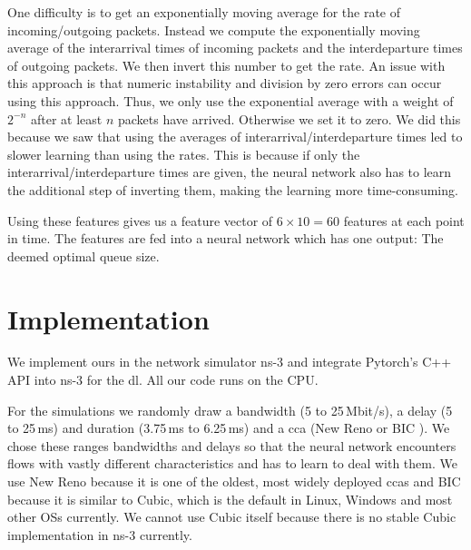 \documentclass[conference]{IEEEtran}
\begin{document}
One difficulty is to get an exponentially moving average for the rate of incoming/outgoing packets. Instead we compute the exponentially moving average of the interarrival times of incoming packets and the interdeparture times of outgoing packets. We then invert this number to get the rate. An issue with this approach is that numeric instability and division by zero errors can occur using this approach. Thus, we only use the exponential average with a weight of $2^{-n}$ after at least $n$ packets have arrived. Otherwise we set it to zero. We did this because we saw that using the averages of interarrival/interdeparture times led to slower learning than using the rates. This is because if only the interarrival/interdeparture times are given, the neural network also has to learn the additional step of inverting them, making the learning more time-consuming. 

Using these features gives us a feature vector of $6\times 10 = 60$ features at each point in time. The features are fed into a neural network which has one output: The deemed optimal queue size.  

\section{Implementation} 

We implement \gls{ours} in the network simulator ns-3 \cite{nsnam_ns-3_nodate} and integrate Pytorch's \cite{paszke_pytorch_2019} C++ API into ns-3 for the \gls{dl}. All our code runs on the CPU. 

For the simulations we randomly draw a bandwidth (5 to 25\,Mbit/s), a delay (5 to 25\,ms) and duration (3.75\,ms to 6.25\,ms) and a \gls{cca} (New Reno or BIC \cite{lisong_xu_binary_2004}). We chose these ranges bandwidths and delays so that the neural network encounters flows with vastly different characteristics and has to learn to deal with them. We use New Reno because it is one of the oldest, most widely deployed \glspl{cca} and BIC because it is similar to Cubic, which is the default in Linux, Windows and most other OSs currently. We cannot use Cubic itself because there is no stable Cubic implementation in ns-3 currently. 
\end{document}
